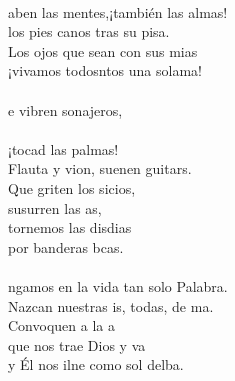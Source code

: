 \begin{cancion}
	\jump\\
	aben las mentes,¡también las almas!\\
	los pies canos tras su pisa.\\
	Los ojos que sean con sus mias\\
	¡vivamos todosntos una solama!\\
	\jump\\
	e vibren sonajeros, \\
	\jump\\
¡tocad las palmas!\\
	Flauta y vion, suenen guitars.\\
	Que griten los sicios, \\
	susurren las as,\\
	tornemos las disdias\\
	por banderas bcas.\\
	\jump\\
	ngamos en la vida tan solo Palabra.\\
	Nazcan nuestras is, todas, de ma.\\
	Convoquen a la a\\
	que nos trae Dios y va\\
	y Él nos ilne como sol delba.\\
\end{cancion}%
